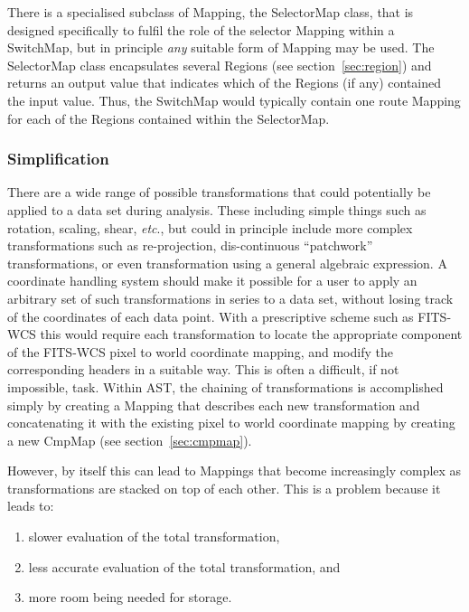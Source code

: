 \documentclass[final,authoryear,5p,times,twocolumn]{elsarticle}
\begin{document}
\begin{description}
There is a specialised subclass of Mapping, the SelectorMap class, that
is designed specifically to fulfil the role of the selector Mapping
within a SwitchMap, but in principle \emph{any} suitable form of Mapping
may be used. The SelectorMap class encapsulates several Regions (see
section~\ref{sec:region}) and returns an output value that indicates
which of the  Regions (if any) contained the input value. Thus, the
SwitchMap would typically contain one route Mapping for each of the
Regions contained within the SelectorMap.

\end{description}


\subsubsection{Simplification}
\label{sec:simplification}

There are a wide range of possible transformations that could
potentially be applied to a data set during analysis. These
including simple things such as rotation, scaling, shear, \emph{etc}., but
could in principle include more complex transformations such as
re-projection, dis-continuous ``patchwork'' transformations, or even
transformation using a general algebraic expression.  A coordinate
handling system should make it possible for a user to apply an
arbitrary set of such transformations in series to a data set, without
losing track of the coordinates of each data point. With a
prescriptive scheme such as FITS-WCS this would require each
transformation to locate the appropriate component of the FITS-WCS
pixel to world coordinate mapping, and modify the corresponding
headers in a suitable way. This is often a difficult, if not
impossible, task. Within AST, the chaining of transformations is
accomplished simply by creating a Mapping that describes each new
transformation and concatenating it with the existing pixel to world
coordinate mapping by creating a new CmpMap (see section~\ref{sec:cmpmap}).

However, by itself this can lead to Mappings that become increasingly
complex as transformations are stacked on top of each other. This is
a problem because it leads to:

\begin{enumerate}
\item slower evaluation of the total transformation,
\item less accurate evaluation of the total transformation, and
\item more room being needed for storage.
\end{enumerate}
\end{document}
